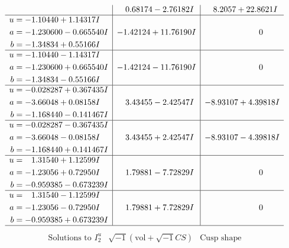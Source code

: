 \documentclass[1p]{elsarticle_modified}
\theoremstyle{definition}
\newcommand{\I}{\sqrt{-1}}
\begin{document}
$$\begin{array}{c|c|c}
 & \phantom{-}0.68174 - 2.76182 I & \phantom{-}8.2057 + 22.8621 I \\ \hline\begin{aligned}
u &= -1.10440 + 1.14317 I \\
a &= -1.230600 - 0.665540 I \\
b &= -1.34834 + 0.55166 I\end{aligned}
 & -1.42124 + 11.76190 I & \phantom{-0.000000 } 0 \\ \hline\begin{aligned}
u &= -1.10440 - 1.14317 I \\
a &= -1.230600 + 0.665540 I \\
b &= -1.34834 - 0.55166 I\end{aligned}
 & -1.42124 - 11.76190 I & \phantom{-0.000000 } 0 \\ \hline\begin{aligned}
u &= -0.028287 + 0.367435 I \\
a &= -3.66048 + 0.08158 I \\
b &= -1.168440 - 0.141467 I\end{aligned}
 & \phantom{-}3.43455 - 2.42547 I & -8.93107 + 4.39818 I \\ \hline\begin{aligned}
u &= -0.028287 - 0.367435 I \\
a &= -3.66048 - 0.08158 I \\
b &= -1.168440 + 0.141467 I\end{aligned}
 & \phantom{-}3.43455 + 2.42547 I & -8.93107 - 4.39818 I \\ \hline\begin{aligned}
u &= \phantom{-}1.31540 + 1.12599 I \\
a &= -1.23056 + 0.72950 I \\
b &= -0.959385 - 0.673239 I\end{aligned}
 & \phantom{-}1.79881 - 7.72829 I & \phantom{-0.000000 } 0 \\ \hline\begin{aligned}
u &= \phantom{-}1.31540 - 1.12599 I \\
a &= -1.23056 - 0.72950 I \\
b &= -0.959385 + 0.673239 I\end{aligned}
 & \phantom{-}1.79881 + 7.72829 I & \phantom{-0.000000 } 0\\
 \hline 
 \end{array}$$\newpage$$\begin{array}{c|c|c}  
\text{Solutions to }I^u_{2}& \I (\text{vol} + \sqrt{-1}CS) & \text{Cusp shape}\\

\end{array}$$
\end{document}
